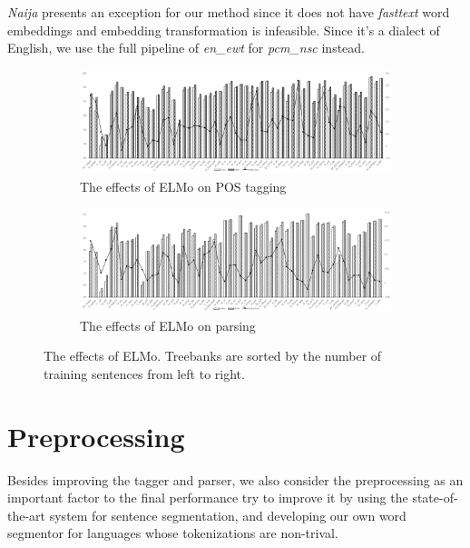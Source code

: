 \documentclass[11pt,a4paper]{article}
\begin{document}
\textit{Naija} presents an exception for our method since it does not have \textit{fasttext}
word embeddings and embedding transformation is infeasible.
Since it's a dialect of English, we use the full pipeline of \textit{en\_ewt} for \textit{pcm\_nsc} instead.
\begin{figure}[t]
	\begin{subfigure}{\textwidth}
	\includegraphics[width=\textwidth]{effects_elmo_tagger}
	\caption{The effects of ELMo on POS tagging}\label{fig:elmo-effect:pos}
	\end{subfigure}
	\begin{subfigure}{\textwidth}
	\includegraphics[width=\textwidth]{effects_elmo_parser}
	\caption{The effects of ELMo on parsing}\label{fig:elmo-effect:par}
	\end{subfigure}
	\caption{The effects of ELMo.
		Treebanks are sorted by the number of training sentences from left to right.}\label{fig:elmo-effect}
\end{figure}

\section{Preprocessing}
Besides improving the tagger and parser,
we also consider the preprocessing as an important factor to
the final performance try to improve it
by using the state-of-the-art system for sentence segmentation,
and developing our own word segmentor for languages
whose tokenizations are non-trival.
\end{document}
